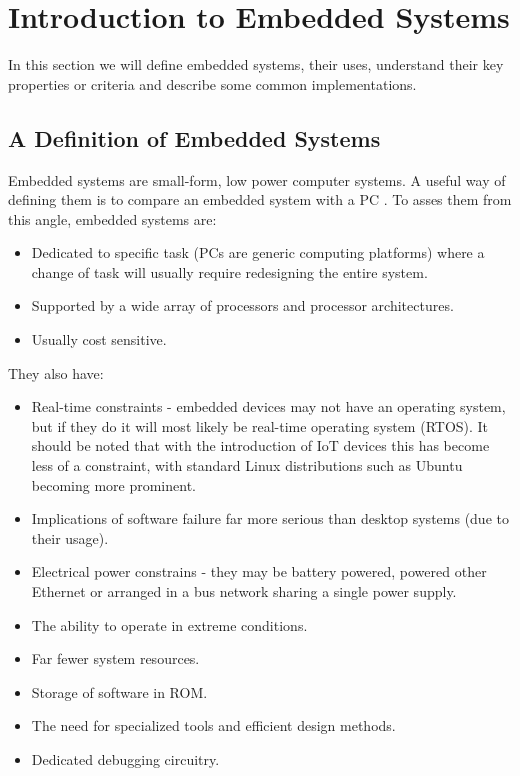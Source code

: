 \section{Introduction to Embedded Systems}

In this section we will define embedded systems, their uses, understand their key properties or criteria and describe some common implementations.

\subsection{A Definition of Embedded Systems}

Embedded systems are small-form, low power computer systems. A useful way of defining them is to compare an embedded system with a PC \cite{BergerArnold2002Esd:}. To asses them from this angle, embedded systems are:
\begin{itemize}
\item Dedicated to specific task (PCs are generic computing platforms) where a change of task will usually require redesigning the entire system.
\item Supported by a wide array of processors and processor architectures.
\item Usually cost sensitive.
\end{itemize}
They also have:
\begin{itemize}
\item Real-time constraints - embedded devices may not have an operating system, but if they do it will most likely be real-time operating system (RTOS). It should be noted that with the introduction of IoT devices this has become less of a constraint, with standard Linux distributions such as Ubuntu becoming more prominent.
\item Implications of software failure far more serious than desktop systems (due to their usage).
\item Electrical power constrains - they may be battery powered, powered other Ethernet or arranged in a bus network sharing a single power supply.
\item The ability to operate in extreme conditions.
\item Far fewer system resources.
\item Storage of software in ROM.
\item The need for specialized tools and efficient design methods.
\item Dedicated debugging circuitry.
\end{itemize}

